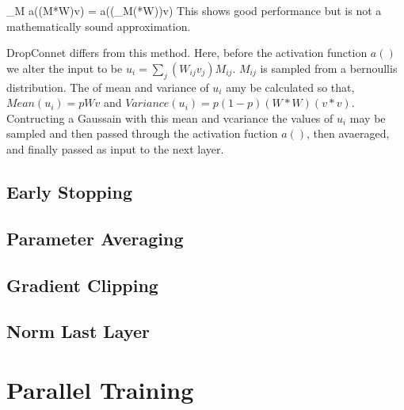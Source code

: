 \be
\sum_M a((M*W)v) = a((\sum_M(*W))v)
\ee
This shows good performance but is not a mathematically sound approximation\citep{goyal2014object}.

DropConnet differs from this method.
Here, before the activation function $a()$ we alter the input to be $u_i=\sum_j(W_{ij}v_j)M_{ij}$.
$M_{ij}$ is sampled from a bernoullis distribution.
The of mean and variance of $u_i$ amy be calculated so that, $Mean(u_i)=pWv$ and $Variance(u_i)=p(1-p)(W*W)(v*v)$.
Contructing a Gaussain with this mean and vcariance the values of $u_i$ may be sampled and then passed through the activation fuction $a()$, then avaeraged, and finally passed as input to the next layer\citep{goyal2014object}.

        \subsection{Early Stopping}




        \subsection{Parameter Averaging}
        
        
        
    	\subsection{Gradient Clipping}
        
        
        
    	\subsection{Norm Last Layer}
        
        
        
       


    
    \section{Parallel Training}
    
